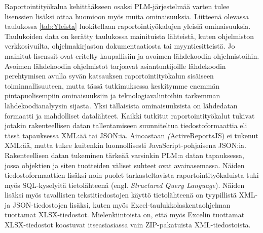 Raportointityökalua kehittääkseen osaksi PLM-järjestelmää varten tulee lisenssien lisäksi ottaa huomioon myös muita ominaisuuksia. Liitteenä olevassa taulukossa \ref{tab:Yleista} luokitellaan raportointiyökalujen yleisiä ominaisuuksia. Taulukoiden data on kerätty taulukossa mainituista lähteistä, kuten ohjelmiston verkkosivuilta, ohjelmakirjaston dokumentaatiosta tai myyntiesitteistä. Jo mainitut lisenssit ovat eritelty kaupallisiin ja avoimen lähdekoodin ohjelmistoihin. Avoimen lähdekoodin ohjelmistot tarjoavat asiantuntijoille lähdekoodin perehtymisen avulla syvän katsauksen raportointityökalun sisäiseen toiminnallisuuteen, mutta tässä tutkimuksessa keskitymme enemmän pintapuolisempiin ominaisuuksiin ja teknologiavalintoihin tarkemman lähdekoodianalyysin sijasta. Yksi tällaisista ominaisuuksista on lähdedatan formaatti ja mahdolliset datalähteet. Kaikki tutkitut raportointityökalut tukivat jotakin rakenteellisen datan tallentamiseen suunniteltua tiedostoformaattia eli tässä tapauksessa XML:ää tai JSON:ia. Ainoastaan \textit(ActiveReportsJS) ei tukenut XML:ää, mutta tukee kuitenkin luonnollisesti JavaScript-pohjaisena JSON:ia. Rakenteellisen datan tukeminen tärkeää varsinkin PLM:n datan tapauksessa, jossa objektien ja siten tuotteiden väliset suhteet ovat avainasemassa. Näiden tiedostoformaattien lisäksi noin puolet tarkasteltavista raportointityökaluista tuki myös SQL-kyselyitä tietolähteenä  (engl. \textit{Structured Query Language}). Näiden lisäksi myös tavallisten tekstitiedostojen käyttö tietolähteenä on tyypillistä XML- ja JSON-tiedostojen lisäksi, kuten myös Excel-taulukkolaskentaohjelman tuottamat XLSX-tiedostot. Mielenkiintoista on, että myös Excelin tuottamat XLSX-tiedostot koostuvat itseasiasiassa vain ZIP-pakatuista XML-tiedostoista. \cite{miner_under_2022}

